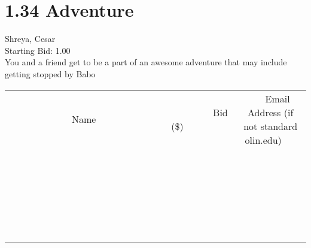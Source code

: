 \documentclass[11pt]{article}
\begin{document}
					\section*{1.34 Adventure}
					Shreya, Cesar \\
					Starting Bid: 1.00 \\
					You and a friend get to be a part of an awesome adventure that may include getting stopped by Babo \\
					[6ex]
					\begin{tabular}{c c c}
						~~~~~~~~~~~~~Name~~~~~~~~~~~~~ & ~~~~~~~~~Bid (\$)~~~~~~~~~ & ~~~Email Address (if not standard olin.edu)~~~ \\
				
 & & \\
\hline
 & & \\
\hline
 & & \\
\hline
 & & \\
\hline
 & & \\
\hline
 & & \\
\hline
 & & \\
\hline
 & & \\
\hline
 & & \\
\hline
 & & \\
\hline
 & & \\
\hline
 & & \\
\hline
 & & \\
\hline
 & & \\
\hline
 & & \\
\hline
 & & \\
\hline
 & & \\
\hline
 & & \\
\hline
 & & \\
\hline
 & & \\
\hline
 & & \\
\hline
 & & \\
\hline
 & & \\
\hline
 & & \\
\hline
 & & \\
\hline
 & & \\
\hline
					\end{tabular}
					\clearpage
				
\end{document}
